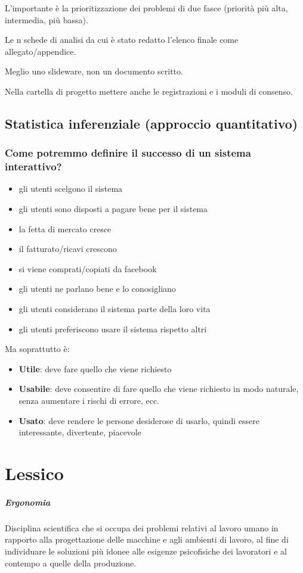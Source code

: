 \documentclass[11pt,a4paper]{book}
\begin{document}
L'importante è la prioritizzazione dei problemi di due fasce (priorità più alta, intermedia, più bassa).

Le n schede di analisi da cui è stato redatto l'elenco finale come allegato/appendice.

Meglio uno slideware, non un documento scritto.

Nella cartella di progetto mettere anche le registrazioni e i moduli di consenso.

\section{Statistica  inferenziale (approccio quantitativo)}
\subsection{Come potremmo definire il successo di un sistema interattivo?}
\begin{itemize}
	\item gli utenti scelgono il sistema
	\item gli utenti sono disposti a pagare bene per il sistema
	\item la fetta di mercato cresce
	\item il fatturato/ricavi crescono
	\item si viene comprati/copiati da facebook
	\item gli utenti ne parlano bene e lo conosigliano
	\item gli utenti considerano il sistema parte della loro vita
	\item gli utenti preferiscono usare il sistema rispetto altri
\end{itemize}

Ma soprattutto è:
\begin{itemize}
	\item \textbf{Utile}: deve fare quello che viene richiesto
	\item \textbf{Usabile}: deve consentire di fare quello che viene richiesto in modo naturale, senza aumentare i rischi di errore, ecc.
	\item \textbf{Usato}: deve rendere le persone desiderose di usarlo, quindi essere interessante, divertente, piacevole
\end{itemize}

\chapter{Lessico}
\paragraph{Ergonomia}
Disciplina scientifica che si occupa dei problemi relativi al lavoro umano in rapporto alla progettazione delle macchine e agli ambienti di lavoro, al fine di individuare le soluzioni più idonee alle esigenze psicofisiche dei lavoratori e al contempo a quelle della produzione.
\end{document}
